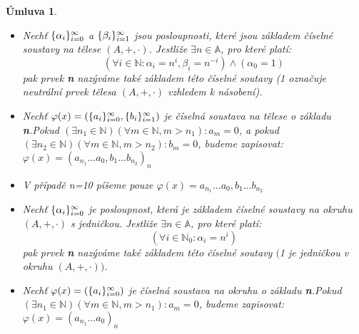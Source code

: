 \documentclass[12pt]{book}
\newtheorem{umluva}{Úmluva}
\begin{document}
\begin{umluva}\label{u1} \textbf \newline
	\begin{itemize}
		\item Nechť $\{\alpha_i\}_{i=0}^{\infty}$ a $\{\beta_i\}_{i=1}^{\infty}$  jsou posloupnosti, které jsou základem číselné soustavy na tělese $(A,+,\cdot)$. Jestliže $\exists n \in \mathbb{A}$, pro které platí:
	$$ (\forall i \in \mathbb{N} : \alpha_i = n^i,\beta_i = n^{-i}) \land (\alpha_{0} = 1)$$
	pak prvek \textbf{n} nazýváme také základem této číselné soutavy (1 označuje neutrální prvek tělesa $(A,+,\cdot)$ vzhledem k násobení).
	\item Nechť $\varphi(x) = (\{a_i\}_{i=0}^{\infty},\{b_i\}_{i=1}^{\infty})$ je číselná soustava na tělese o základu \textbf{n}.\newline Pokud $(\exists n_1 \in \mathbb{N}) (\forall m \in \mathbb{N},m>n_1):a_m = 0$, a pokud $(\exists n_2 \in \mathbb{N}) (\forall m \in \mathbb{N},m>n_2):b_m = 0$, budeme zapisovat: $\varphi(x) = (a_{n_1} ... a_0,b_1 ... b_{n_2})_n$
	\item V případě n=10 píšeme pouze $\varphi(x) = a_{n_1} ... a_0,b_1 ... b_{n_2}$
	\item Nechť $\{\alpha_i\}_{i=0}^{\infty}$ je posloupnost, která je základem číselné soustavy na okruhu $(A,+,\cdot)$ s jedničkou. Jestliže $\exists n \in \mathbb{A}$, pro které platí:
	$$ (\forall i \in \mathbb{N}_0 : \alpha_i = n^i)$$
	pak prvek \textbf{n} nazýváme také základem této číselné soutavy $($1 je jedničkou v okruhu $(A,+,\cdot))$.
	\item Nechť $\varphi(x) = (\{a_i\}_{i=0}^{\infty})$ je číselná soustava na okruhu o základu \textbf{n}.\newline Pokud $(\exists n_1 \in \mathbb{N}) (\forall m \in \mathbb{N},m>n_1):a_m = 0$, budeme zapisovat: $\varphi(x) = (a_{n_1} ... a_0)_n$
\end{itemize}
\end{umluva}

\newpage
\end{document}
